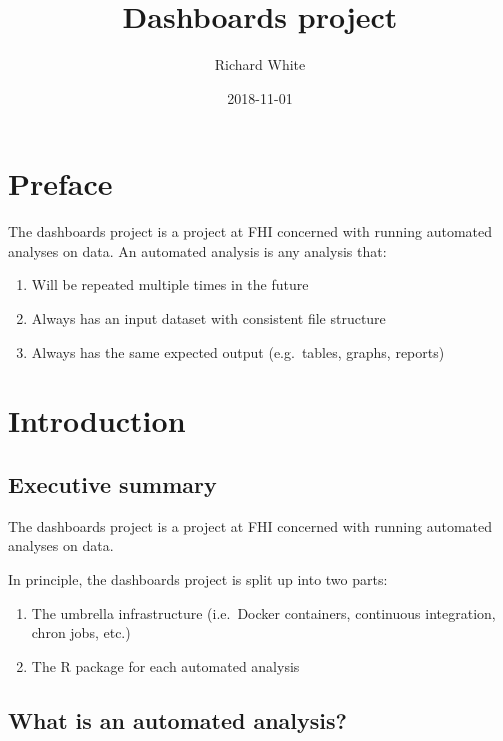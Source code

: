 \documentclass[12pt,]{article}
\title{Dashboards project}
\author{Richard White}
\date{2018-11-01}
\providecommand{\tightlist}{%
  \setlength{\itemsep}{0pt}\setlength{\parskip}{0pt}}
\begin{document}
\maketitle

{
\hypersetup{linkcolor=black}
\setcounter{tocdepth}{2}
\tableofcontents
}
\listoftables
\listoffigures
\section*{Preface}\label{preface}

The dashboards project is a project at FHI concerned with running
automated analyses on data. An automated analysis is any analysis that:

\begin{enumerate}
\def\labelenumi{\arabic{enumi}.}
\tightlist
\item
  Will be repeated multiple times in the future
\item
  Always has an input dataset with consistent file structure
\item
  Always has the same expected output (e.g.~tables, graphs, reports)
\end{enumerate}

\section{Introduction}\label{introduction}

\subsection{Executive summary}\label{executive-summary}

The dashboards project is a project at FHI concerned with running
automated analyses on data.

In principle, the dashboards project is split up into two parts:

\begin{enumerate}
\def\labelenumi{\arabic{enumi}.}
\tightlist
\item
  The umbrella infrastructure (i.e.~Docker containers, continuous
  integration, chron jobs, etc.)
\item
  The R package for each automated analysis
\end{enumerate}

\subsection{What is an automated
analysis?}\label{what-is-an-automated-analysis}
\end{document}
